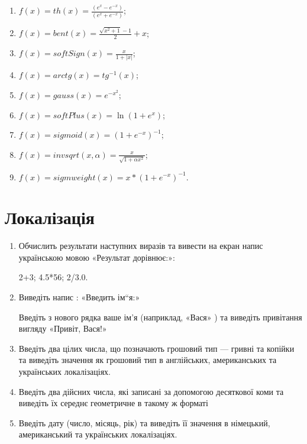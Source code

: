 \documentclass[]{article}
\makeatletter
\newcommand{\xslalph}[1]{\expandafter\@xslalph\csname c@#1\endcsname}
\newcommand{\@xslalph}[1]{%
    \ifcase#1\or а\or б\or в\or г\or д\or e\or є\or ж\or з\or i%
    \or й\or к\or л\or м\or н\or о\or п\or р\or с\or т%
    \or у\or ф\or х\or ц\or ч\or ш\or ю\or я\or аа\or бб\or вв %
    \else\@ctrerr\fi%
}
\makeatother
\begin{document}
\begin{enumerate}
  \begin{enumerate}[label=\xslalph*)]
  \item   \(f(x) = th(x) = \frac{(e^{x} - e^{-x})}{(e^{x} + e^{-x})}\);
\item \(f(x) = bent(x) = \frac{\sqrt{x^{2} + 1} - 1}{2} + x\);
\item \(f(x) = softSign(x) = \frac{x}{1 + |x|}\);
\item \(f(x) = arctg(x) = tg^{-1}(x)\);
\item\(f(x) = gauss(x) = e^{-x^{2}}\);
\item \(f(x) = softPlus(x) = \ln(1 + e^{x})\);
\item \(f(x) = sigmoid(x) = {(1 + e^{-x})}^{-1}\);
\item \(f(x) = invsqrt(x,\alpha) = \frac{x}{\sqrt{1 + \alpha x^{2}}}\);
\item\(f(x) = sigmweight(x) = x*{(1 + e^{-x})}^{-1}\).

 \end{enumerate}

\end{enumerate}

\section{Локалізація}
\begin{enumerate}
\item
Обчислить результати наступних виразів та вивести на екран напис
українською мовою «Результат дорівнює:»:

2+3; 4.5*56; 2/3.0.
\item
Виведіть напис : «Введить ім``я:»

Введіть з нового рядка ваше ім'я (наприклад, «Вася» ) та виведіть
привітання вигляду «Привіт, Вася!»
\item
Введіть два цілих числа, що позначають грошовий тип --- гривні та
копійки та виведіть значення як грошовий тип в англійських,
американських та українських локалізаціях.
\item
Введіть два дійсних числа, які записані за допомогою десяткової коми та
виведіть їх середнє геометричне в такому ж форматі
\item
Введіть дату (число, місяць, рік) та виведіть її значення в німецький,
американський та українських локалізаціях.
\end{enumerate}
\end{document}
